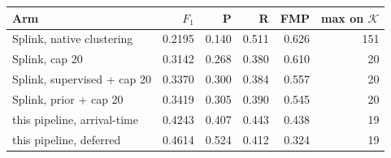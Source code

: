 \begin{tabular}{lrrrrr}
\toprule
Arm & $F_1$ & P & R & FMP & max on $\mathcal{K}$ \\
\midrule
Splink, native clustering & 0.2195 & 0.140 & 0.511 & 0.626 & 151 \\
Splink, cap 20 & 0.3142 & 0.268 & 0.380 & 0.610 & 20 \\
Splink, supervised + cap 20 & 0.3370 & 0.300 & 0.384 & 0.557 & 20 \\
Splink, prior + cap 20 & 0.3419 & 0.305 & 0.390 & 0.545 & 20 \\
\midrule
this pipeline, arrival-time & 0.4243 & 0.407 & 0.443 & 0.438 & 19 \\
this pipeline, deferred & 0.4614 & 0.524 & 0.412 & 0.324 & 19 \\
\bottomrule
\end{tabular}